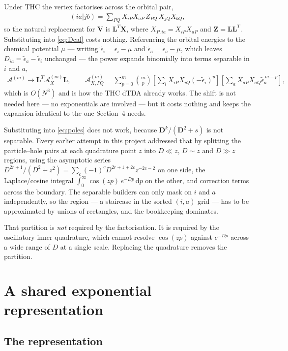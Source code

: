 \documentclass[11pt]{article}
\newcommand{\mat}[1]{{\mathbf{#1}}}
\newcommand{\sqrbrckts}[1]{\left[#1\right]}
\newcommand{\Dcal}{\mathcal{A}}
\newcommand{\eb}{\tilde{\epsilon}}
\begin{document}
Under THC the vertex factorises across the orbital pair,
\begin{align}
    (ia|jb) = \sum_{PQ} X_{iP} X_{aP}\, Z_{PQ}\, X_{jQ} X_{bQ} ,
\end{align}
so the natural replacement for $\mat{V}$ is $\mat{L}^T \mat{X}$, where
$X_{P,ia} = X_{iP} X_{aP}$ and $\mat{Z} = \mat{L}\mat{L}^T$. Substituting into
\eqref{eq:Dcal} costs nothing. Referencing the orbital energies to the chemical potential
$\mu$ --- writing $\eb_i = \epsilon_i - \mu$ and $\eb_a = \epsilon_a - \mu$, which leaves
$D_{ia} = \eb_a - \eb_i$ unchanged --- the power expands binomially into terms separable in
$i$ and $a$,
\begin{align}
    \Dcal^{(m)} \to \mat{L}^T \Dcal_X^{(m)} \mat{L} ,
    \qquad
    \Dcal_{X,PQ}^{(m)} = \sum_{p=0}^{m} \binom{m}{p}
        \sqrbrckts{\sum_i X_{iP} X_{iQ} (-\eb_i)^p}
        \sqrbrckts{\sum_a X_{aP} X_{aQ} \eb_a^{\,m-p}} ,
    \label{eq:binomialD}
\end{align}
which is $O(N^3)$ and is how the THC dTDA already works. The shift is not needed here ---
no exponentials are involved --- but it costs nothing and keeps the expansion identical to
the one Section~4 needs.

Substituting into \eqref{eq:poles} does not work, because $\mat{D}^k/(\mat{D}^2+s)$ is not
separable. Every earlier attempt in this project addressed that by splitting the
particle--hole pairs at each quadrature point $z$ into $D \ll z$, $D \sim z$ and $D \gg z$
regions, using the asymptotic series
$D^{2r+1}/(D^2+z^2) = \sum_c (-1)^c D^{2r+1+2c} z^{-2c-2}$ on one side, the Laplace/cosine
integral $\int_0^\infty \cos(zp)\, e^{-Dp}\,\mathrm{d}p$ on the other, and correction terms
across the boundary. The separable builders can only mask on $i$ and $a$ independently, so
the region --- a staircase in the sorted $(i,a)$ grid --- has to be approximated by unions of
rectangles, and the bookkeeping dominates.

That partition is \emph{not} required by the factorisation. It is required by the
oscillatory inner quadrature, which cannot resolve $\cos(zp)$ against $e^{-Dp}$ across a
wide range of $D$ at a single scale. Replacing the quadrature removes the partition.

\section{A shared exponential representation}

\subsection{The representation}
\end{document}
